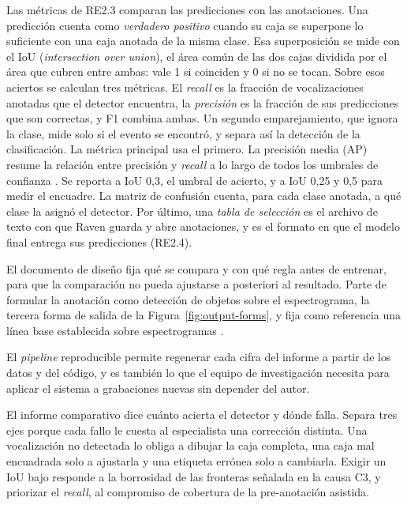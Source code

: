 Las métricas de RE2.3 comparan las predicciones con las anotaciones. Una
predicción cuenta como \emph{verdadero positivo} cuando su caja se superpone lo
suficiente con una caja anotada de la misma clase. Esa superposición se mide con
el IoU (\textit{intersection over union}), el área común de las dos cajas dividida
por el área que cubren entre ambas: vale 1 si coinciden y 0 si no se tocan. Sobre
esos aciertos se calculan tres métricas. El \textit{recall} es la fracción de
vocalizaciones anotadas que el detector encuentra, la \emph{precisión} es la
fracción de sus predicciones que son correctas, y F1 combina ambas. Un segundo
emparejamiento, que ignora la clase, mide solo si el evento se encontró, y separa
así la detección de la clasificación. La métrica principal usa el primero. La
precisión media (AP) resume la relación entre precisión y \textit{recall} a lo
largo de todos los umbrales de confianza \citep{everingham_pascal_2010}. Se
reporta a IoU 0,3, el umbral de acierto, y a IoU 0,25 y 0,5 para medir el
encuadre. La matriz de confusión cuenta, para cada clase anotada, a qué clase la
asignó el detector. Por último, una \emph{tabla de selección} es el archivo de
texto con que Raven guarda y abre anotaciones, y es el formato en que el modelo
final entrega sus predicciones (RE2.4).

 El documento de diseño fija qué se compara y con qué
regla antes de entrenar, para que la comparación no pueda ajustarse a posteriori
al resultado. Parte de formular la anotación como detección de objetos sobre el
espectrograma, la tercera forma de salida de la Figura~\ref{fig:output-forms}, y
fija como referencia una línea base establecida sobre espectrogramas
\citep{escobar-amado_computer_2024,gonzalez_yolo-based_2025}.

 El \textit{pipeline} reproducible permite regenerar
cada cifra del informe a partir de los datos y del código, y es también lo que el
equipo de investigación necesita para aplicar el sistema a grabaciones nuevas sin
depender del autor.

 El informe comparativo dice cuánto acierta el detector y
dónde falla. Separa tres ejes porque cada fallo le cuesta al especialista una
corrección distinta. Una vocalización no detectada lo obliga a dibujar la caja
completa, una caja mal encuadrada solo a ajustarla y una etiqueta errónea solo a
cambiarla. Exigir un IoU bajo responde a la borrosidad de las fronteras señalada
en la causa C3, y priorizar el \textit{recall}, al compromiso de cobertura de la
pre-anotación asistida.

